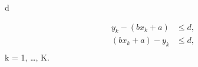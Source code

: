 \documentclass{article}
\begin{document}
 d

\begin{align*}
y_k - (bx_k + a) & \leq d, \\
(bx_k + a) - y_k & \leq d, \\
\end{align*}
 k = 1, \ldots, K.
\end{document}
